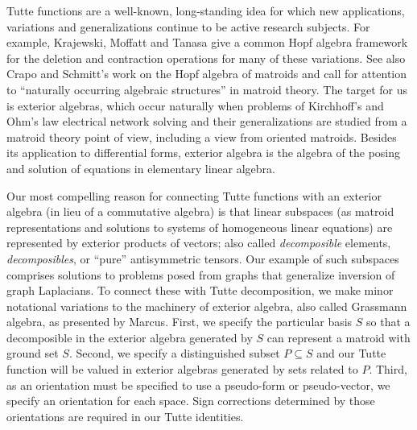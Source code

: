 \documentclass[Unicode]{cedram-alco}
\begin{document}
\noindent
Tutte functions are a well-known, long-standing idea
for which new applications, variations and generalizations
continue to be active research subjects. For example,
Krajewski, Moffatt and Tanasa give a common Hopf algebra framework
for the deletion and contraction operations for many of
these variations\cite{KRAJEWSKI2018271}.
See also Crapo and Schmitt's work
on the Hopf algebra of matroids and call
for attention to ``naturally occurring algebraic
structures'' in matroid theory\cite{CRAPO20051066}.  The target for us
is exterior algebras, which occur naturally when problems of
Kirchhoff's and Ohm's law electrical network solving and their
generalizations are studied from a matroid theory point of view,
including a view from oriented matroids.  Besides its application
to differential forms, exterior algebra is
the algebra of the posing and solution of equations in elementary
linear algebra\cite{ExteriorAlgInLinalgRef}.


Our most compelling reason for connecting
Tutte functions with an exterior algebra (in lieu of a commutative
algebra) is that linear subspaces (as matroid representations and
solutions to systems of homogeneous linear equations)
are represented by exterior products of vectors; also called
\emph{decomposible} elements, \emph{decomposibles},
or ``pure'' antisymmetric tensors.
Our example of such subspaces
comprises solutions to problems posed from graphs that generalize inversion
of graph Laplacians.  To connect these with Tutte decomposition, we make
minor notational variations to the machinery of exterior algebra, also called Grassmann algebra,
as presented by Marcus\cite{MarcusFDMuAlPt2}.  First, we specify the particular basis $S$
so that a decomposible in the exterior algebra generated by $S$
can represent a matroid with ground set $S$.  Second, we specify a distinguished subset $P\subseteq S$
and our Tutte function will be valued in exterior algebras generated by sets related to $P$.
Third, as an orientation must be specified to use a pseudo-form or pseudo-vector\cite{Frankel},
we specify an orientation for each space.  Sign corrections determined by those orientations
are required in our Tutte identities.
\end{document}

